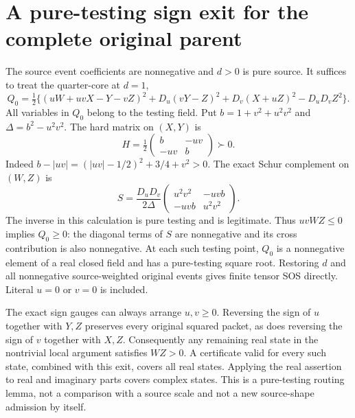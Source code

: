 \section{A pure-testing sign exit for the complete original parent}
The source event coefficients are nonnegative and $d>0$ is pure source.
It suffices to treat the quarter-core at $d=1$,
\[
 Q_0=\tfrac12\{(uW+uvX-Y-vZ)^2+D_u(vY-Z)^2
                   +D_v(X+uZ)^2-D_uD_vZ^2\}.
\]
All variables in $Q_0$ belong to the testing field. Put
$b=1+v^2+u^2v^2$ and $\Delta=b^2-u^2v^2$.
The hard matrix on $(X,Y)$ is
\[
 H=\tfrac12\begin{pmatrix}b&-uv\\-uv&b\end{pmatrix}\succ0.
\]
Indeed $b-|uv|=(|uv|-1/2)^2+3/4+v^2>0$.
The exact Schur complement on $(W,Z)$ is
\[
 S=\frac{D_uD_v}{2\Delta}
 \begin{pmatrix}u^2v^2&-uvb\\-uvb&u^2v^2\end{pmatrix}.
\]
The inverse in this calculation is pure testing and is legitimate.
Thus $uvWZ\le0$ implies $Q_0\ge0$: the diagonal terms of $S$
are nonnegative and its cross contribution is also nonnegative.
At each such testing point, $Q_0$ is a nonnegative element of a real
closed field and has a pure-testing square root. Restoring $d$ and
all nonnegative source-weighted original events gives finite tensor
SOS directly. Literal $u=0$ or $v=0$ is included.

The exact sign gauges can always arrange $u,v\ge0$. Reversing the
sign of $u$ together with $Y,Z$ preserves every original squared
packet, as does reversing the sign of $v$ together with $X,Z$.
Consequently any remaining real state in the nontrivial local
argument satisfies $WZ>0$. A certificate valid for every such state,
combined with this exit, covers all real states. Applying the real
assertion to real and imaginary parts covers complex states.
This is a pure-testing routing lemma, not a comparison with a source
scale and not a new source-shape admission by itself.
